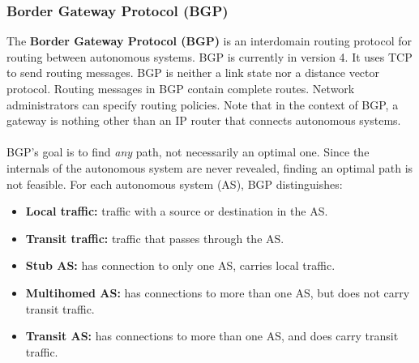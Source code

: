 \documentclass[a4paper,11pt]{article}
\begin{document}
\subsubsection{Border Gateway Protocol (BGP)}
The \textbf{Border Gateway Protocol (BGP)} is an interdomain routing protocol for routing between autonomous systems. 
BGP is currently in version 4. 
It uses TCP to send routing messages. 
BGP is neither a link state nor a distance vector protocol. 
Routing messages in BGP contain complete routes.
Network administrators can specify routing policies.
Note that in the context of BGP, a gateway is nothing other than an IP router that connects autonomous systems.
\\\\
BGP's goal is to find \emph{any} path, not necessarily an optimal one. 
Since the internals of the autonomous system are never revealed, finding an optimal path is not feasible.
For each autonomous system (AS), BGP distinguishes: 
\begin{itemize}
    \item   \textbf{Local traffic:} traffic with a source or destination in the AS.
    \item   \textbf{Transit traffic:} traffic that passes through the AS.
    \item   \textbf{Stub AS:} has connection to only one AS, carries local traffic.
    \item   \textbf{Multihomed AS:} has connections to more than one AS, but does not carry transit traffic.
    \item   \textbf{Transit AS:} has connections to more than one AS, and does carry transit traffic.
\end{itemize}
\end{document}
